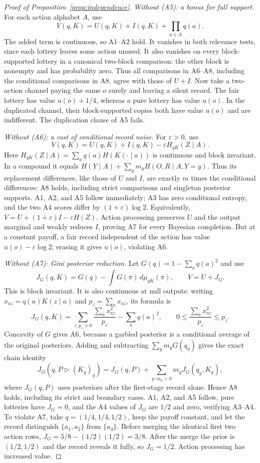 \documentclass[11pt,a4paper]{article}
\theoremstyle{definition}
\newcommand{\Sh}{H}
\newcommand{\1}{\mathbf 1}
\begin{document}
\begin{proof}[Proof of Proposition~\ref{prop:independence}]
\emph{Without \textup{(A5)}: a bonus for full support.}
For each action alphabet $A$, use
\[
 V(q,K)=U(q,K)+I(q,K)+\prod_{a\in A}q(a).
\]
The added term is continuous, so A1--A2 hold.  It vanishes in both relevance
tests, since each lottery leaves some action unused.  It also vanishes on
every block-supported lottery in a canonical two-block comparison: the
other block is nonempty and has probability zero.  Thus all comparisons in
A6--A8, including the conditional comparisons in A8, agree with those of $U+I$.
Now take a two-action channel paying the same $o$ surely and leaving a
silent record.  The fair lottery has value $u(o)+1/4$, whereas a pure lottery
has value $u(o)$.  In the duplicated channel, their block-supported copies
both have value $u(o)$ and are indifferent.  The duplication clause of A5 fails.

\emph{Without \textup{(A6)}: a cost of conditional record noise.}
For $\varepsilon>0$, use
\begin{equation}
 V(q,K)=U(q,K)+I(q,K)-\varepsilon\Sh_{qK}(Z\mid A).
 \label{eq:no-record-dp}
\end{equation}
Here $\Sh_{qK}(Z\mid A)=\sum_aq(a)\Sh(K(\cdot\mid a))$ is continuous
and block invariant.  In a compound it equals
$\Sh(Y\mid A)+\sum_y m_y\Sh(O,R\mid A,Y=y)$.
Thus its replacement differences, like those of $U$ and $I$, are exactly
$m$ times the conditional differences: A8 holds, including strict
comparisons and singleton posterior supports.  A1, A2, and A5 follow
immediately; A3 has zero conditional entropy, and the two A4 scores differ
by $(1+\varepsilon)\log2$.
Equivalently, $V=U+(1+\varepsilon)I-\varepsilon\Sh(Z)$.
Action processing preserves $U$ and the output marginal and weakly reduces
$I$, proving A7 for every Bayesian completion.  But at a constant payoff, a fair
record independent of the action has value $u(o)-\varepsilon\log2$;
erasing it gives $u(o)$, violating A6.

\emph{Without \textup{(A7)}: Gini posterior reduction.}
Let $G(q)=1-\sum_aq(a)^2$ and use
\[
 J_G(q,K)=G(q)-\int G(\pi)\,d\mu_{qK}(\pi),\qquad V=U+J_G.
\]
This is block invariant.  It is also continuous at null outputs: writing
$x_{az}=q(a)K(z\mid a)$ and $p_z=\sum_a x_{az}$, its formula is
\[
 J_G(q,K)=\sum_{z:p_z>0}\frac{\sum_a x_{az}^2}{p_z}-\sum_aq(a)^2,
 \qquad 0\le\frac{\sum_a x_{az}^2}{p_z}\le p_z.
\]
Concavity of $G$ gives A6, because a garbled posterior is a conditional
average of the original posteriors.  Adding and subtracting
$\sum_y m_yG(q_y)$ gives the exact chain identity
\[
 J_G(q,P\triangleright(K_y)_y)
 =J_G(q,P)+\sum_{y:m_y>0}m_yJ_G(q_y,K_y),
\]
where $J_G(q,P)$ uses posteriors after the first-stage record alone.
Hence A8 holds, including its strict and boundary cases.  A1, A2, and A5
follow, pure lotteries have $J_G=0$, and the A4 values of $J_G$ are
$1/2$ and zero, verifying A3--A4.
To violate A7, take $q=(1/4,1/4,1/2)$, keep the payoff constant, and let the
record distinguish $\{a_1,a_2\}$ from $\{a_3\}$.  Before merging the
identical first two action rows, $J_G=5/8-(1/2)(1/2)=3/8$.
After the merge the prior is $(1/2,1/2)$ and the record reveals it fully,
so $J_G=1/2$.  Action processing has increased value.


\end{proof}
\end{document}
